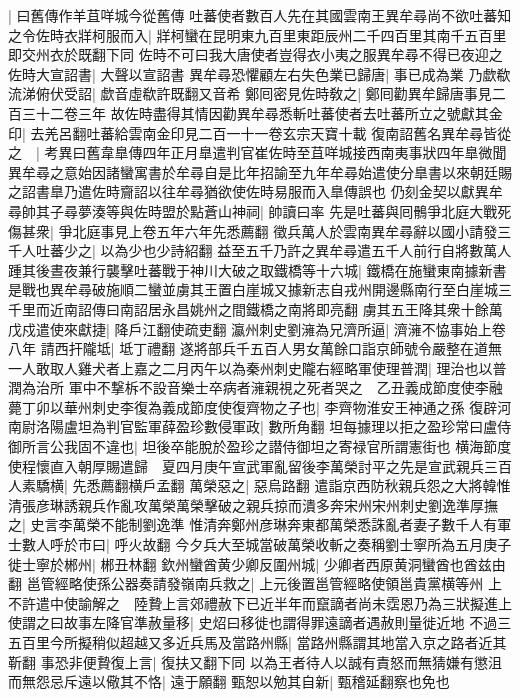 |{
	曰舊傳作羊苴咩城今從舊傳}
吐蕃使者數百人先在其國雲南王異牟尋尚不欲吐蕃知之令佐時衣牂柯服而入|{
	牂柯蠻在昆明東九百里東距辰州二千四百里其南千五百里即交州衣於既翻下同}
佐時不可曰我大唐使者豈得衣小夷之服異牟尋不得已夜迎之佐時大宣詔書|{
	大聲以宣詔書}
異牟尋恐懼顧左右失色業已歸唐|{
	事已成為業}
乃歔欷流涕俯伏受詔|{
	歔音虛欷許既翻又音希}
鄭囘密見佐時敎之|{
	鄭囘勸異牟歸唐事見二百三十二卷三年}
故佐時盡得其情因勸異牟尋悉斬吐蕃使者去吐蕃所立之號獻其金印|{
	去羌呂翻吐蕃給雲南金印見二百一十一卷玄宗天寶十載}
復南詔舊名異牟尋皆從之　|{
	考異曰舊韋臯傳四年正月臯遣判官崔佐時至苴咩城接西南夷事狀四年臯微聞異牟尋之意始因諸蠻寓書於牟尋自是比年招諭至九年牟尋始遣使分臯書以來朝廷賜之詔書臯乃遣佐時齎詔以往牟尋猶欲使佐時易服而入臯傳誤也}
仍刻金契以獻異牟尋帥其子尋夢湊等與佐時盟於點蒼山神祠|{
	帥讀曰率}
先是吐蕃與囘鶻爭北庭大戰死傷甚衆|{
	爭北庭事見上卷五年六年先悉薦翻}
徵兵萬人於雲南異牟尋辭以國小請發三千人吐蕃少之|{
	以為少也少詩紹翻}
益至五千乃許之異牟尋遣五千人前行自將數萬人踵其後晝夜兼行襲擊吐蕃戰于神川大破之取鐵橋等十六城|{
	鐵橋在施蠻東南據新書是戰也異牟尋破施順二蠻並虜其王置白崖城又據新志自戎州開邊縣南行至白崖城三千里而近南詔傳曰南詔居永昌姚州之間鐵橋之南將即亮翻}
虜其五王降其衆十餘萬戊戍遣使來獻捷|{
	降戶江翻使疏吏翻}
瀛州刺史劉澭為兄濟所逼|{
	濟澭不恊事始上卷八年}
請西扞隴坻|{
	坻丁禮翻}
遂將部兵千五百人男女萬餘口詣京師號令嚴整在道無一人敢取人雞犬者上嘉之二月丙午以為秦州刺史隴右經略軍使理普潤|{
	理治也以普潤為治所}
軍中不撃柝不設音樂士卒病者澭親視之死者哭之　乙丑義成節度使李融薨丁卯以華州刺史李復為義成節度使復齊物之子也|{
	李齊物淮安王神通之孫}
復辟河南尉洛陽盧坦為判官監軍薛盈珍數侵軍政|{
	數所角翻}
坦每據理以拒之盈珍常曰盧侍御所言公我固不違也|{
	坦後卒能脫於盈珍之譛侍御坦之寄禄官所謂憲街也}
横海節度使程懷直入朝厚賜遣歸　夏四月庚午宣武軍亂留後李萬榮討平之先是宣武親兵三百人素驕横|{
	先悉薦翻横戶孟翻}
萬榮惡之|{
	惡烏路翻}
遣詣京西防秋親兵怨之大將韓惟清張彦琳誘親兵作亂攻萬榮萬榮擊破之親兵掠而潰多奔宋州宋州刺史劉逸準厚撫之|{
	史言李萬榮不能制劉逸準}
惟清奔鄭州彦琳奔東都萬榮悉誅亂者妻子數千人有軍士數人呼於市曰|{
	呼火故翻}
今夕兵大至城當破萬榮收斬之奏稱劉士寧所為五月庚子徙士寧於郴州|{
	郴丑林翻}
欽州蠻酋黄少卿反圍州城|{
	少卿者西原黄洞蠻酋也酋兹由翻}
邕管經略使孫公器奏請發嶺南兵救之|{
	上元後置邕管經略使領邕貴黨横等州}
上不許遣中使諭解之　陸贄上言郊禮赦下已近半年而竄謫者尚未霑恩乃為三狀擬進上使謂之曰故事左降官準赦量移|{
	史炤曰移徙也謂得罪遠謫者遇赦則量徙近地}
不過三五百里今所擬稍似超越又多近兵馬及當路州縣|{
	當路州縣謂其地當入京之路者近其靳翻}
事恐非便贄復上言|{
	復扶又翻下同}
以為王者待人以誠有責怒而無猜嫌有懲沮而無怨忌斥遠以儆其不恪|{
	遠于願翻}
甄恕以勉其自新|{
	甄稽延翻察也免也}
